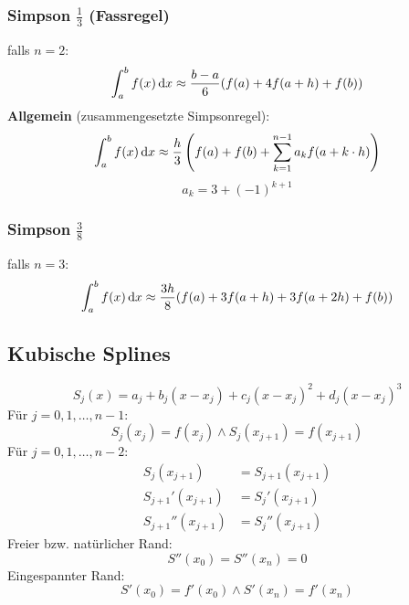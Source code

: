 \documentclass[german]{latex4ei/latex4ei_sheet}
\begin{document}
\begin{sectionbox}
\subsubsection{Simpson $\frac{1}{3}$ (Fassregel)}
falls $n = 2$:
\begin{equation*}
	\int_a^b f(x) \diff x \approx \frac{b - a}{6} (f(a) + 4 f(a + h) + f(b))
\end{equation*}
\textbf{Allgemein} (zusammengesetzte Simpsonregel):
\begin{equation*}
	\int_a^b f(x) \diff x \approx \frac{h}{3} \left( f(a) + f(b) + \sum_{k = 1}^{n - 1} a_k f(a + k \cdot h) \right)
\end{equation*}
\begin{equation*}
	a_k = 3 + (-1)^{k + 1}
\end{equation*}

\subsubsection{Simpson $\frac{3}{8}$}
falls $n = 3$:
\begin{equation*}
	\int_a^b f(x) \diff x \approx \frac{3h}{8} (f(a) + 3 f(a + h) + 3 f(a + 2h) + f(b))
\end{equation*}
\end{sectionbox}

\begin{sectionbox}
\subsection{Kubische Splines}
\begin{equation*}
	S_j(x) = a_j + b_j (x-x_j) + c_j (x-x_j)^2 + d_j (x-x_j)^3
\end{equation*}
Für $j=0,1,\ldots,n-1$:
\begin{equation*}
	S_j(x_j) = f(x_j) \wedge S_j(x_{j+1}) = f(x_{j+1})
\end{equation*}
Für $j=0,1,\ldots,n-2$:
\begin{align*}
	S_j(x_{j+1}) &= S_{j+1}(x_{j+1})\\
	S_{j+1}'(x_{j+1}) &= S_j'(x_{j+1})\\
	S_{j+1}''(x_{j+1}) &= S_j''(x_{j+1})
\end{align*}
Freier bzw. natürlicher Rand:
\begin{equation*}
	S''(x_0) = S''(x_n) = 0
\end{equation*}
Eingespannter Rand:
\begin{equation*}
	S'(x_0) = f'(x_0) \wedge S'(x_n) = f'(x_n)
\end{equation*}
\end{sectionbox}
\end{document}
